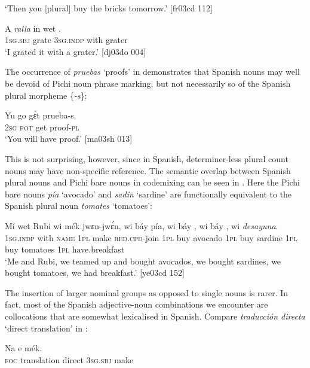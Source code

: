 \glt ‘Then you [plural] buy the bricks tomorrow.’ [fr03cd 112]
\z


\ea%
    \label{ex:key:1699}
    \gll A    \textit{ralla}    ín    wet    .\\
\textsc{1sg.sbj}  grate  \textsc{3sg.indp}  with    grater\\
\glt ‘I grated it with a grater.’ [dj03do 004]
\z

The occurrence of \textit{pruebas} ‘proofs’ in  demonstrates that Spanish nouns may well be devoid of Pichi noun phrase marking, but not necessarily so of the Spanish plural morpheme \{\textit{{}-s}\}: 


\ea%
    \label{ex:key:1700}
    \gll Yu  go  gɛ́t  prueba-s.\\
\textsc{2sg}  \textsc{pot}  get  proof-\textsc{pl}\\

\glt ‘You will have proof.’ [ma03sh 013]
\z

This is not surprising, however, since in Spanish, determiner-less plural count nouns may have non-specific reference. The semantic overlap between Spanish plural nouns and Pichi bare nouns in codemixing can be seen in . Here the Pichi bare nouns \textit{pía} ‘avocado’ and \textit{sadín} ‘sardine’ are functionally equivalent to the Spanish plural noun \textit{tomates} ‘tomatoes’:


\ea%
    \label{ex:key:1701}
    \gll Mí    wet    Rubi    wi  mék    jwɛn-jwɛ́n,  wi  báy  pía,
wi  báy  ,  wi  báy  ,    wi  \textit{desayuna}.\\
\textsc{1sg.indp}  with    \textsc{name}  \textsc{1pl}  make  \textsc{red}.\textsc{cpd}{}-join  \textsc{1pl}  buy  avocado
\textsc{1pl}  buy  sardine  \textsc{1pl}  buy  tomatoes  \textsc{1pl}  have.breakfast\\

\glt ‘Me and Rubi, we teamed up and bought avocados, we bought sardines, 
we bought tomatoes, we had breakfast.’ [ye03cd 152]
\z

The insertion of larger nominal groups as opposed to single nouns is rarer. In fact, most of the Spanish adjective-noun combinations we encounter are collocations that are somewhat lexicalised in Spanish. Compare \textit{traducción directa} ‘direct translation’ in :


\ea%
    \label{ex:key:1702}
    \gll Na      e    mék.\\
\textsc{foc}  translation  direct  \textsc{3sg.sbj}  make\\

